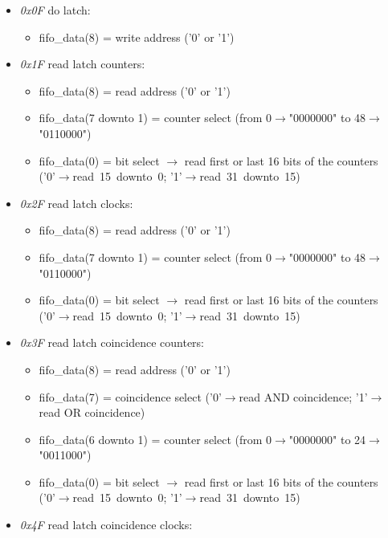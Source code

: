 \begin{itemize}
	\item \textit{0x0F} do latch: 
	\begin{itemize}
		\item fifo\_data(8) = write address ('0' or '1')
	\end{itemize}
	\item \textit{0x1F} read latch counters:
	\begin{itemize}
		\item fifo\_data(8) = read address ('0' or '1')
		\item fifo\_data(7 downto 1) = counter select (from 0$\rightarrow$"0000000" to 48$\rightarrow$"0110000")
		\item fifo\_data(0) = bit select $\rightarrow$ read first or last 16 bits of the counters \\('0'$\rightarrow$read~15~downto~0; '1'$\rightarrow$read~31~downto~15)
	\end{itemize}
	\item \textit{0x2F} read latch clocks:
	\begin{itemize}
		\item fifo\_data(8) = read address ('0' or '1')
		\item fifo\_data(7 downto 1) = counter select (from 0$\rightarrow$"0000000" to 48$\rightarrow$"0110000")
		\item fifo\_data(0) = bit select $\rightarrow$ read first or last 16 bits of the counters \\('0'$\rightarrow$read~15~downto~0; '1'$\rightarrow$read~31~downto~15)
	\end{itemize}
	\item \textit{0x3F} read latch coincidence counters:
	\begin{itemize}
		\item fifo\_data(8) = read address ('0' or '1')
		\item fifo\_data(7) = coincidence select ('0'$\rightarrow$read AND coincidence; '1'$\rightarrow$read OR coincidence)
		\item fifo\_data(6 downto 1) = counter select (from 0$\rightarrow$"0000000" to 24$\rightarrow$"0011000")
		\item fifo\_data(0) = bit select $\rightarrow$ read first or last 16 bits of the counters \\('0'$\rightarrow$read~15~downto~0; '1'$\rightarrow$read~31~downto~15)
	\end{itemize}
	\item \textit{0x4F} read latch coincidence clocks:

\end{itemize}
